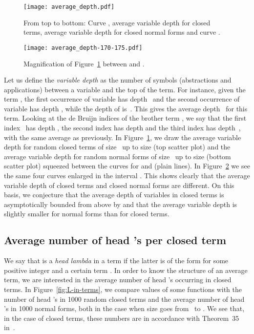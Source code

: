 \documentclass{jfp1}
\begin{document}
\begin{figure}[htb!]
  \centering
  \texttt{[image: average\_depth.pdf]}
  \caption{\textsf{From top to bottom:} Curve , average variable
    depth for closed terms, average variable depth for closed normal forms and curve
    .}
  \label{fig:av_depth}
\end{figure}

\begin{figure}[htb!]
  \centering
  \texttt{[image: average\_depth-170-175.pdf]}
  \caption{Magnification of Figure~\ref{fig:av_depth} between  and .}
  \label{fig:av_depth_170_175}
\end{figure}

Let us define the \emph{variable depth} as the number of symbols (abstractions and
applications) between a variable and the top of the term. For instance, given the
term , the first occurrence of variable 
has depth~ and the second occurrence of variable  has depth , while the
depth of  is~.  This gives the average depth~ for this term.  Looking at the de
Bruijn indices of the brother term , we
say that the first index~ has depth , the second index  has
depth  and the third index  has depth~, with the same average  as
previously.  In Figure~\ref{fig:av_depth}, we draw the average variable depth for
 random closed terms of size~ up to size  (top scatter plot) and the average
variable depth for  random normal forms of size~ up to size  (bottom
scatter plot) squeezed between the curves  for  and 
(plain lines).  In Figure~\ref{fig:av_depth_170_175} we see the same four curves
enlarged in the interval .  This shows clearly that the
average variable depth of closed terms and closed normal forms are different.  On this basis, we
conjecture that the average depth of variables in closed terms is asymptotically bounded from above by
 and that the average variable depth is slightly smaller for
normal forms than for closed terms.

\subsection{Average number of head 's per closed term}
\label{sec:average-number-l}

We say that  is a \emph{head lambda} in a term  if the latter is of the
form  for some positive integer  and a
certain term .  In order to know the structure of an average term, we are
interested in the average number of head 's occurring in closed terms.  In
Figure~\ref{fig:L-in-terms}, we compare values of some functions  
with the number of head 's in 1000 random closed terms and
the average number of head 's in 1000 normal forms, both in the case when size
goes from~ to .  We see that, in the case of closed terms, these numbers are
in accordance with Theorem~35 in~\cite{DBLP:journals/corr/abs-0903-5505}.
\end{document}
